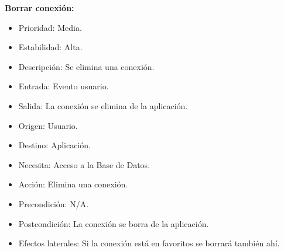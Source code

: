 \textbf{Borrar conexión:}
\begin{itemize}
\item Prioridad: Media.
\item Estabilidad: Alta.
\item Descripción: Se elimina una conexión.
\item Entrada: Evento usuario.
\item Salida: La conexión se elimina de la aplicación.
\item Origen: Usuario.
\item Destino: Aplicación.
\item Necesita: Acceso a la Base de Datos.
\item Acción: Elimina una conexión.
\item Precondición: N/A.
\item Postcondición: La conexión se borra de la aplicación.
\item Efectos laterales: Si la conexión está en favoritos se borrará también ahí.\\

\end{itemize}

